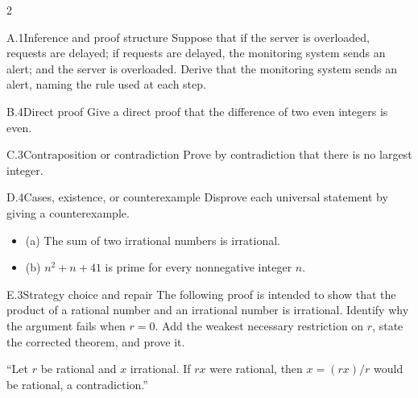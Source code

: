 \documentclass[9pt]{extarticle}
\begin{document}
\begin{multicols}{2}
\begin{CoreProblem}{A.1}{Inference and proof structure}
Suppose that if the server is overloaded, requests are delayed; if requests are
delayed, the monitoring system sends an alert; and the server is overloaded.
Derive that the monitoring system sends an alert, naming the rule used at each
step.
\end{CoreProblem}
\begin{CoreProblem}{B.4}{Direct proof}
Give a direct proof that the difference of two even integers is even.
\end{CoreProblem}
\begin{CoreProblem}{C.3}{Contraposition or contradiction}
Prove by contradiction that there is no largest integer.
\end{CoreProblem}
\columnbreak
\begin{CoreProblem}{D.4}{Cases, existence, or counterexample}
Disprove each universal statement by giving a counterexample.
\begin{itemize}
  \item (a) The sum of two irrational numbers is irrational.
  \item (b) $n^2+n+41$ is prime for every nonnegative integer $n$.
\end{itemize}
\end{CoreProblem}
\begin{CoreProblem}{E.3}{Strategy choice and repair}
The following proof is intended to show that the product of a rational number
and an irrational number is irrational. Identify why the argument fails when
$r=0$. Add the weakest necessary restriction on $r$, state the corrected
theorem, and prove it.

``Let $r$ be rational and $x$ irrational. If $rx$ were rational, then $x=(rx)/r$ would be rational, a contradiction.''
\end{CoreProblem}
\end{multicols}
\CoreWorkArea
\FormBreak
{}
\end{document}
